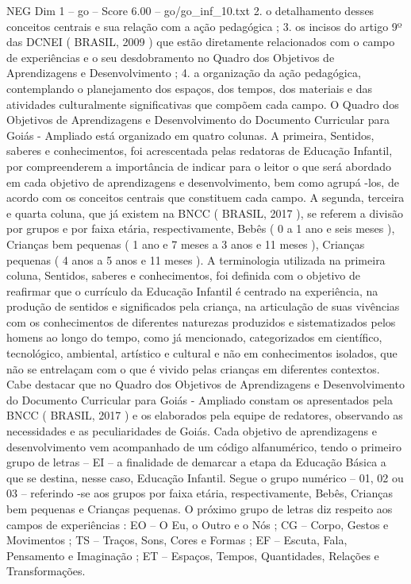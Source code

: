 \begin{textsample}{NEG Dim 1 – go – Score 6.00 – go/go\_inf\_10.txt}  \label{ex:f1_neg_199}
2. o detalhamento desses conceitos centrais e sua relação com a ação pedagógica ; 3. os incisos do artigo 9º das DCNEI ( BRASIL, 2009 ) que estão diretamente relacionados com o campo de experiências e o seu desdobramento no Quadro dos Objetivos de Aprendizagens e Desenvolvimento ; 4. a organização da ação pedagógica, contemplando o planejamento dos espaços, dos tempos, dos materiais e das atividades culturalmente significativas que compõem cada campo.
O Quadro dos Objetivos de Aprendizagens e Desenvolvimento do Documento Curricular para Goiás - Ampliado está organizado em quatro colunas.
A primeira, Sentidos, saberes e conhecimentos, foi acrescentada pelas redatoras de Educação Infantil, por compreenderem a importância de indicar para o leitor o que será abordado em cada objetivo de aprendizagens e desenvolvimento, bem como agrupá -los, de acordo com os conceitos centrais que constituem cada campo.
A segunda, terceira e quarta coluna, que já existem na BNCC ( BRASIL, 2017 ), se referem a divisão por grupos e por faixa etária, respectivamente, Bebês ( 0 a 1 ano e seis meses ), Crianças bem pequenas ( 1 ano e 7 meses a 3 anos e 11 meses ), Crianças pequenas ( 4 anos a 5 anos e 11 meses ).
A terminologia utilizada na primeira coluna, Sentidos, saberes e conhecimentos, foi definida com o objetivo de reafirmar que o currículo da Educação Infantil é centrado na experiência, na produção de sentidos e significados pela criança, na articulação de suas vivências com os conhecimentos de diferentes naturezas produzidos e sistematizados pelos homens ao longo do tempo, como já mencionado, categorizados em científico, tecnológico, ambiental, artístico e cultural e não em conhecimentos isolados, que não se entrelaçam com o que é vivido pelas crianças em diferentes contextos.
Cabe destacar que no Quadro dos Objetivos de Aprendizagens e Desenvolvimento do Documento Curricular para Goiás - Ampliado constam os apresentados pela BNCC ( BRASIL, 2017 ) e os elaborados pela equipe de redatores, observando as necessidades e as peculiaridades de Goiás.
Cada objetivo de aprendizagens e desenvolvimento vem acompanhado de um código alfanumérico, tendo o primeiro grupo de letras – EI – a finalidade de demarcar a etapa da Educação Básica a que se destina, nesse caso, Educação Infantil.
Segue o grupo numérico – 01, 02 ou 03 – referindo -se aos grupos por faixa etária, respectivamente, Bebês, Crianças bem pequenas e Crianças pequenas.
O próximo grupo de letras diz respeito aos campos de experiências : EO – O Eu, o Outro e o Nós ; CG – Corpo, Gestos e Movimentos ; TS – Traços, Sons, Cores e Formas ; EF – Escuta, Fala, Pensamento e Imaginação ; ET – Espaços, Tempos, Quantidades, Relações e Transformações.

\end{textsample}
